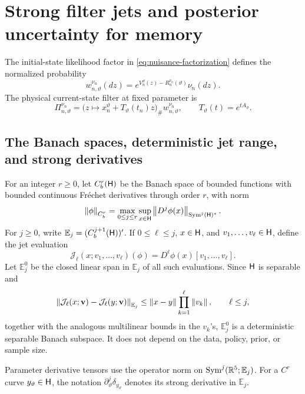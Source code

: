 
\section{Strong filter jets and posterior uncertainty for memory}
\label{sec:filter-memory}

The initial-state likelihood factor in \eqref{eq:nuisance-factorization}
defines the normalized probability
\[
 w_{n,\vartheta}^{\nu_n}(dz)
 =e^{V_n^\vartheta(z)-R_n^{\nu_n}(\vartheta)}\nu_n(dz).
\]
The physical current-state filter at fixed parameter is
\begin{equation}
 \Pi_{n,\vartheta}^{\nu_n}
 =\bigl(z\mapsto x_n^\vartheta+T_\vartheta(t_n)z\bigr)_\#
   w_{n,\vartheta}^{\nu_n},
 \qquad T_\vartheta(t)=e^{tA_\vartheta}.
 \label{eq:physical-filter}
\end{equation}

\subsection{The Banach spaces, deterministic jet range, and strong derivatives}

For an integer \(r\ge0\), let \(C_b^r(\mathsf H)\) be the Banach space of bounded
functions with bounded continuous Fr\'echet derivatives through order \(r\),
with norm
\[
 \left\|\phi\right\|_{C_b^r}
 =\max_{0\le j\le r}
 \sup_{x\in\mathsf H}\left\|D^j\phi(x)\right\|_{\operatorname{Sym}^j(\mathsf H)^*}.
\]
For \(j\ge0\), write \(\mathbb E_j=(C_b^{j+1}(\mathsf H))'\).  If
\(0\le\ell\le j\), \(x\in\mathsf H\), and
\(v_1,\ldots,v_\ell\in\mathsf H\), define the jet evaluation
\[
 \mathcal J_{\ell}(x;v_1,\ldots,v_\ell)(\phi)
 =D^\ell\phi(x)[v_1,\ldots,v_\ell].
\]
Let \(\mathbb E_j^0\) be the closed linear span in \(\mathbb E_j\) of all
such evaluations.  Since \(\mathsf H\) is separable and
\[
 \left\|\mathcal J_\ell(x;\mathbf v)-
       \mathcal J_\ell(y;\mathbf v)\right\|_{\mathbb E_j}
 \le \left\|x-y\right\|\prod_{k=1}^\ell\left\|v_k\right\|,
 \qquad \ell\le j,
\]
together with the analogous multilinear bounds in the \(v_k\)'s,
\(\mathbb E_j^0\) is a deterministic separable Banach subspace.  It does not
depend on the data, policy, prior, or sample size.

Parameter derivative tensors use the operator norm on
\(\operatorname{Sym}^j(\mathbb R^5;\mathbb E_j)\).  For a \(C^r\) curve
\(y_\vartheta\in\mathsf H\), the notation
\(\partial_\vartheta^j\delta_{y_\vartheta}\) denotes its strong derivative
in \(\mathbb E_j\).

